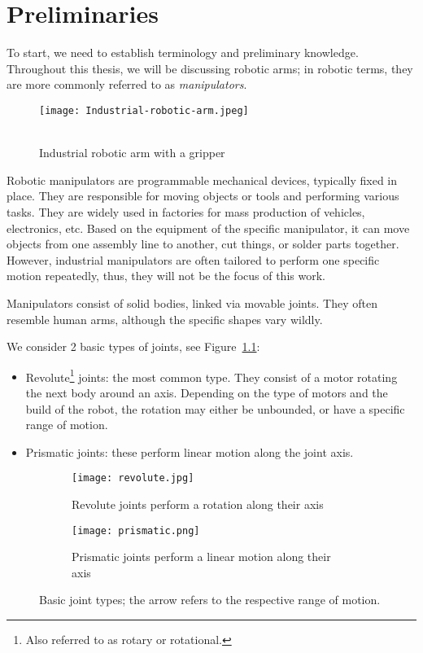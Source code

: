 \chapter{Preliminaries}

To start, we need to establish terminology and preliminary knowledge. Throughout this thesis, we will be discussing robotic arms; in robotic terms, they are more commonly referred to as \textit{manipulators}.

\begin{wrapfigure}{r}{0.35\textwidth}
    \centering
    \texttt{[image: Industrial-robotic-arm.jpeg]}
  \caption{\\Industrial robotic arm with a gripper~\cite{manipulator}}
\end{wrapfigure}


Robotic manipulators are programmable mechanical devices, typically fixed in place. They are responsible for moving objects or tools and performing various tasks. They are widely used in factories for mass production of vehicles, electronics, etc. Based on the equipment of the specific manipulator, it can move objects from one assembly line to another, cut things, or solder parts together. However, industrial manipulators are often tailored to perform one specific motion repeatedly, thus, they will not be the focus of this work.

Manipulators consist of solid bodies, linked via movable joints. They often resemble human arms, although the specific shapes vary wildly.

We consider 2 basic types of joints, see Figure~\ref{fig:basicjoints}:
\begin{itemize}
  \item Revolute\footnote{Also referred to as rotary or rotational.} joints: the most common type. They consist of a motor rotating the next body around an axis. Depending on the type of motors and the build of the robot, the rotation may either be unbounded, or have a specific range of motion.
  \item Prismatic joints: these perform linear motion along the joint axis.
\end{itemize}

\begin{figure}[h]
\centering
\begin{subfigure}{.5\textwidth}
  \centering
  \texttt{[image: revolute.jpg]}
  \caption{Revolute joints perform a rotation along their axis}
\end{subfigure}%
\begin{subfigure}{.5\textwidth}
  \centering
  \texttt{[image: prismatic.png]}
  \caption{Prismatic joints perform a linear motion along their axis}
\end{subfigure}
\caption{Basic joint types; the arrow refers to the respective range of motion.}
\label{fig:basicjoints}
\end{figure}

